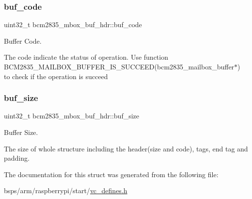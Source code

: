 \subsubsection{\texorpdfstring{buf\_code}{buf\_code}}
{\footnotesize\ttfamily uint32\+\_\+t bcm2835\+\_\+mbox\+\_\+buf\+\_\+hdr\+::buf\+\_\+code}



Buffer Code. 

The code indicate the status of operation. Use function B\+C\+M2835\+\_\+\+M\+A\+I\+L\+B\+O\+X\+\_\+\+B\+U\+F\+F\+E\+R\+\_\+\+I\+S\+\_\+\+S\+U\+C\+C\+E\+E\+D(bcm2835\+\_\+mailbox\+\_\+buffer$\ast$) to check if the operation is succeed \mbox{\label{structbcm2835__mbox__buf__hdr_aee9a1bffb64d27b0560e7c52f83f4a66}} 
\subsubsection{\texorpdfstring{buf\_size}{buf\_size}}
{\footnotesize\ttfamily uint32\+\_\+t bcm2835\+\_\+mbox\+\_\+buf\+\_\+hdr\+::buf\+\_\+size}



Buffer Size. 

The size of whole structure including the header(size and code), tags, end tag and padding. 

The documentation for this struct was generated from the following file\+:\begin{DoxyCompactItemize}
\item 
bsps/arm/raspberrypi/start/\mbox{\hyperlink{vc__defines_8h}{vc\+\_\+defines.\+h}}\end{DoxyCompactItemize}
